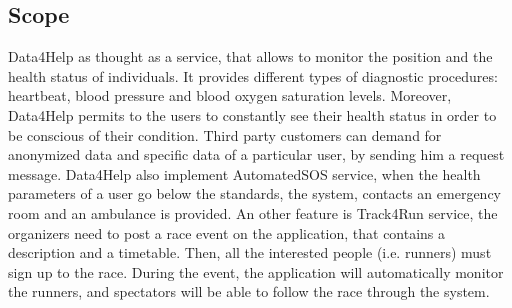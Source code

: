 \subsection{Scope}
Data4Help as thought as a service, that allows to monitor the position and the health status of individuals. It provides different types of diagnostic procedures: heartbeat, blood pressure and blood oxygen saturation levels. Moreover, Data4Help permits to the users to constantly see their health status in order to be conscious of their condition. Third party customers can demand for anonymized data and specific data of a particular user, by sending him a request message. Data4Help also implement AutomatedSOS service, when the health parameters of a user go below the standards, the system, contacts an emergency room and an ambulance is provided. An other feature is Track4Run service, the organizers need to post a race event on the application, that contains a description and a timetable. Then, all the interested people (i.e. runners) must sign up to the race. During the event, the application will automatically monitor the runners, and spectators will be able to follow the race through the system.
